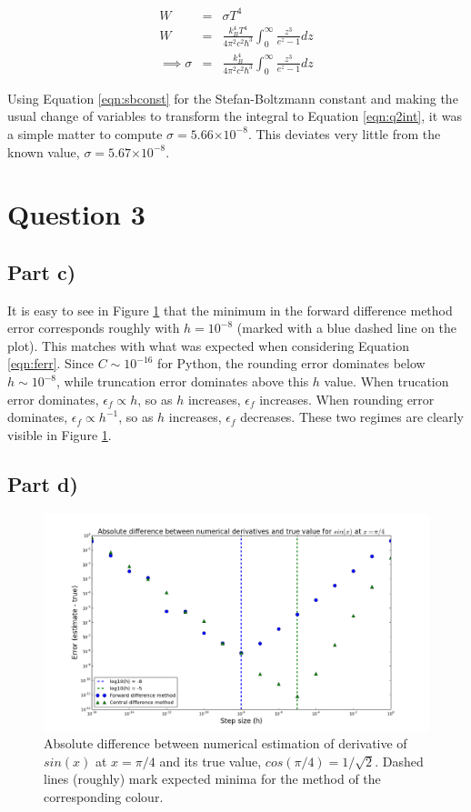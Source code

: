 \documentclass[a4paper,12pt]{article}
\providecommand{\e}[1]{\ensuremath{\times 10^{#1}}}
\begin{document}
\begin{eqnarray}
W &=& \sigma T^4\nonumber\\
W &=& \frac{k_B^4 T^4}{4\pi^2c^2\hbar^3}\int_0^{\infty}\frac{z^3}{e^z - 1}dz\nonumber\\
\implies \sigma &=& \frac{k_B^4}{4\pi^2c^2\hbar^3}\int_0^{\infty}\frac{z^3}{e^z - 1}dz
\label{eqn:sbconst}
\end{eqnarray}

Using Equation \ref{eqn:sbconst} for the Stefan-Boltzmann constant and making the usual change of variables to transform the integral to Equation \ref{eqn:q2int}, it was a simple matter to compute $\sigma = 5.66\e{-8}$. This deviates very little from the known value, $\sigma = 5.67\e{-8}$.

\section{Question 3}
\subsection{Part c)}

It is easy to see in Figure \ref{fig:q3} that the minimum in the forward difference method error corresponds roughly with $h = 10^{-8}$ (marked with a blue dashed line on the plot). This matches with what was expected when considering Equation \ref{eqn:ferr}. Since $C\sim10^{-16}$ for Python, the rounding error dominates below $h\sim 10^{-8}$, while truncation error dominates above this $h$ value. When trucation error dominates, $\epsilon_f \propto h$, so as $h$ increases, $\epsilon_f$ increases. When rounding error dominates, $\epsilon_f \propto h^{-1}$, so as $h$ increases, $\epsilon_f$ decreases. These two regimes are clearly visible in Figure \ref{fig:q3}.

\subsection{Part d)} 

\begin{figure}[H]
\centering
\includegraphics[width = \linewidth]{lab3q3.png}
\caption{Absolute difference between numerical estimation of derivative of $sin(x)$ at $x=\pi/4$ and its true value, $cos(\pi/4) = 1/\sqrt{2}$. Dashed lines (roughly) mark expected minima for the method of the corresponding colour.}
\label{fig:q3}
\end{figure}
\end{document}
